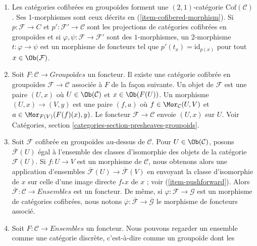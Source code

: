 \begin{remarks}
\begin{enumerate}
et $\mathcal{F}'$ sont des catégories cofibrées en groupoïdes au-dessus de
$\mathcal{C}$, nous notons les morphismes de $\mathcal{F}$ vers $\mathcal{F}'$
par $\Mor_\mathcal{C}(\mathcal{F}, \mathcal{F}')$.
\item
\label{item-definition-cofibered-groupoids-2-category}
Les catégories cofibrées en groupoïdes forment une $(2, 1)$-catégorie
$\text{Cof}(\mathcal{C})$. Ses 1-morphismes sont ceux décrits en
(\ref{item-cofibered-morphism}). Si $p : \mathcal{F} \to C$ et
$p': \mathcal{F}' \to \mathcal{C}$ sont les projections de catégories
cofibrées en groupoïdes et si $\varphi, \psi : \mathcal{F} \to \mathcal{F}'$
sont des $1$-morphismes, un 2-morphisme $t : \varphi \to \psi$ est un morphisme
de foncteurs tel que $p'(t_x) = \text{id}_{p(x)}$ pour tout $x \in \Ob(\mathcal{F})$.
\item
\label{item-construction-associated-cofibered-groupoid}
Soit $F : \mathcal{C} \to \textit{Groupoïdes}$ un foncteur. Il
existe une catégorie cofibrée en groupoïdes $\mathcal{F} \to \mathcal{C}$
associée à $F$ de la façon suivante. Un objet de $\mathcal{F}$ est une paire $(U, x)$
où $U \in \Ob(\mathcal{C})$ et $x \in \Ob(F(U))$. Un
morphisme $(U, x) \to (V, y)$ est une paire $(f, a)$ où
$f \in \Mor_\mathcal{C}(U, V)$ et
$a \in \Mor_{F(V)}(F(f)(x), y)$.
Le foncteur $\mathcal{F} \to \mathcal{C}$ envoie $(U, x)$ sur $U$. Voir
Catégories, section \ref{categories-section-presheaves-groupoids}.
\item
\label{item-associated-functor-isomorphism-classes}
Soit $\mathcal{F}$ cofibrée en groupoïdes au-dessus de $\mathcal{C}$.
Pour $U \in \Ob(\mathcal{C})$, posons $\overline{\mathcal{F}}(U)$ égal à
l'ensemble des classes d'isomorphie des objets de la catégorie $\mathcal{F}(U)$.
Si $f : U \to V$ est un morphisme de $\mathcal{C}$, nous obtenons alors une
application d'ensembles $\overline{\mathcal{F}}(U) \to \overline{\mathcal{F}}(V)$ en
envoyant la classe d'isomorphie de $x$ sur celle d'une image directe
$f_*x$ de $x$ ; voir (\ref{item-pushforward}). Alors
$\overline{\mathcal{F}} : \mathcal{C} \to \textit{Ensembles}$ est un
foncteur. De même, si $\varphi : \mathcal{F} \to \mathcal{G}$ est un
morphisme de catégories cofibrées, nous notons
$\overline{\varphi}: \overline{\mathcal{F}} \to  \overline{\mathcal{G}}$
le morphisme de foncteurs associé.
\item
\label{item-convention-cofibered-sets}
Soit $F: \mathcal{C} \to \textit{Ensembles}$ un foncteur. Nous pouvons regarder un
ensemble comme une catégorie discrète, c'est-à-dire comme un groupoïde dont les

\end{enumerate}
\end{remarks}
